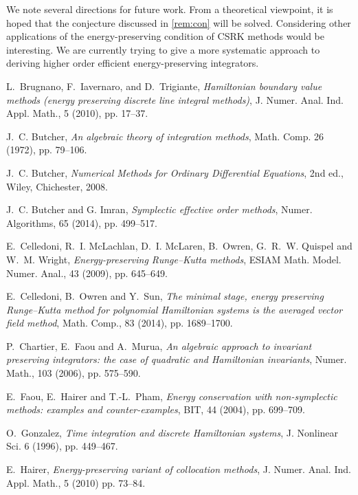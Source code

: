 \documentclass[final,leqno,onefignum,onetabnum]{siamltex1213}
\begin{document}
We note several directions for future work.
From a theoretical viewpoint, it is hoped that the conjecture discussed in \autoref{rem:con}
will be solved.
Considering other applications of the energy-preserving condition of CSRK methods
would be interesting.
We are currently trying to give a more systematic approach to 
deriving higher order efficient energy-preserving integrators.

\begin{thebibliography}{99}
{\sc L.~Brugnano, F.~Iavernaro, and D.~Trigiante},
\emph{Hamiltonian boundary value methods
(energy preserving discrete line integral methods)},
J. Numer. Anal. Ind. Appl. Math., 5 (2010), pp. 17--37.

{\sc J.~C. Butcher},
\emph{An algebraic theory of integration methods},
Math. Comp. 26 (1972), pp. 79--106.

{\sc J.~C. Butcher},
\emph{Numerical Methods for Ordinary Differential Equations},
2nd ed., Wiley, Chichester, 2008.

{\sc J.~C. Butcher and G. Imran},
\emph{Symplectic effective order methods},
Numer. Algorithms, 65 (2014), pp. 499--517.

{\sc E.~Celledoni, R.~I. McLachlan, D.~I. McLaren, B.~Owren, G.~R.~W. Quispel and
W.~M. Wright},
\emph{Energy-preserving Runge--Kutta methods},
ESIAM Math. Model. Numer. Anal., 43 (2009), pp. 645--649.

{\sc E.~Celledoni, B.~Owren and Y.~Sun},
\emph{The minimal stage, energy preserving Runge--Kutta method
for polynomial Hamiltonian systems is the averaged vector field method},
Math. Comp., 83 (2014), pp. 1689--1700.

{\sc P.~Chartier, E.~Faou and A.~Murua},
\emph{An algebraic approach to invariant preserving integrators:
the case of quadratic and Hamiltonian invariants},
Numer. Math., 103 (2006), pp. 575--590.

{\sc E.~Faou, E.~Hairer and T.-L.~Pham},
\emph{Energy conservation with non-symplectic methods: examples and counter-examples},
BIT, 44 (2004), pp. 699--709.

{\sc O.~Gonzalez},
\emph{Time integration and discrete Hamiltonian systems},
J. Nonlinear Sci. 6 (1996), pp. 449--467.

{\sc E.~Hairer},
\emph{Energy-preserving variant of collocation methods},
J. Numer. Anal. Ind. Appl. Math., 5 (2010) pp. 73--84.


\end{thebibliography}
\end{document}
